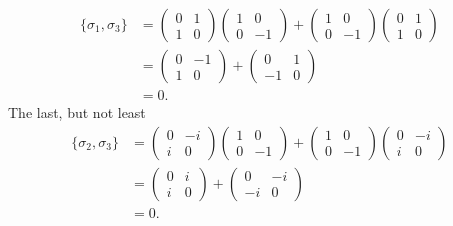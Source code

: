 \documentclass[10pt]{article}
\begin{document}
\begin{align*}
\{ \sigma_1, \sigma_3 \} &= 
\begin{pmatrix}
0 & 1 \\
1 & 0
\end{pmatrix}
\begin{pmatrix}
1 & 0 \\
0 & -1
\end{pmatrix} + \begin{pmatrix}
1 & 0 \\
0 & -1
\end{pmatrix}
\begin{pmatrix}
0 & 1 \\
1 & 0
\end{pmatrix} \\
   &= 
   \begin{pmatrix}
   0 & -1 \\
   1 & 0
   \end{pmatrix} +
   \begin{pmatrix}
   0 & 1 \\
   -1 & 0
   \end{pmatrix} \\
   &= 0.
\end{align*}
The last, but not least
\begin{align*}
\{ \sigma_2, \sigma_3 \} &= 
\begin{pmatrix}
0 & -i \\
i & 0
\end{pmatrix}
\begin{pmatrix}
1 & 0 \\
0 & -1
\end{pmatrix} + \begin{pmatrix}
1 & 0 \\
0 & -1
\end{pmatrix}
\begin{pmatrix}
0 & -i \\
i & 0
\end{pmatrix} \\
   &= 
   \begin{pmatrix}
   0 & i \\
   i & 0
   \end{pmatrix} +
   \begin{pmatrix}
   0 & -i \\
   -i & 0
   \end{pmatrix} \\
   &= 0.
\end{align*}
\end{document}
